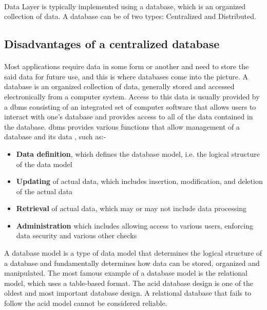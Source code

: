 \documentclass[12pt]{article}
\begin{document}
        \paragraph{}Data Layer is typically implemented using a database, which is an organized collection of data. A database can be of two types: Centralized and Distributed.
        
    \subsection{Disadvantages of a centralized database}
        \paragraph{}
        Most applications require data in some form or another and need to store the said data for future use, and this is where databases come into the picture.
        A database is an organized collection of data, generally stored and accessed electronically from a computer system.
        Access to this data is usually provided by a \acrfull{dbms} consisting of an integrated set of computer software that allows users to interact with one's database and provides access to all of the data contained in the database.
        \acrshort{dbms} provides various functions that allow management of a database and its data \cite{wikidbms}, such as:-
        \begin{itemize}
            \item \textbf{Data definition}, which defines the database model, i.e. the logical structure of the data model
            \item \textbf{Updating} of actual data, which includes insertion, modification, and deletion of the actual data
            \item \textbf{Retrieval} of actual data, which may or may not include data processing
            \item \textbf{Administration} which includes allowing access to various users, enforcing data security and various other checks
        \end{itemize}
        A database model is a type of data model that determines the logical structure of a database and fundamentally determines how data can be stored, organized and manipulated. The most famous example of a database model is the relational model, which uses a table-based format. The \acrfull{acid} database design is one of the oldest and most important database design. A relational database that fails to follow the \acrshort{acid} model cannot be considered reliable. 
\end{document}
